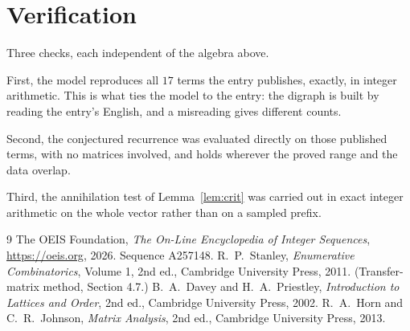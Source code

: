 \documentclass[11pt,a4paper]{article}
\theoremstyle{plain}
\theoremstyle{definition}
\begin{document}
\section{Verification}

Three checks, each independent of the algebra above.

First, the model reproduces all $17$ terms the entry publishes, exactly, in integer
arithmetic. This is what ties the model to the entry: the digraph is built by reading the
entry's English, and a misreading gives different counts.

Second, the conjectured recurrence was evaluated directly on those published terms, with no
matrices involved, and holds wherever the proved range and the data overlap.

Third, the annihilation test of Lemma~\ref{lem:crit} was carried out in exact integer
arithmetic on the whole vector rather than on a sampled prefix.

\begin{thebibliography}{9}
 The OEIS Foundation, \emph{The On-Line Encyclopedia of Integer
Sequences}, \url{https://oeis.org}, 2026. Sequence A257148.
 R.~P.~Stanley, \emph{Enumerative Combinatorics}, Volume 1, 2nd ed.,
Cambridge University Press, 2011. (Transfer-matrix method, Section 4.7.)
 B.~A.~Davey and H.~A.~Priestley, \emph{Introduction to Lattices and
Order}, 2nd ed., Cambridge University Press, 2002.
 R.~A.~Horn and C.~R.~Johnson, \emph{Matrix Analysis}, 2nd ed., Cambridge
University Press, 2013.
\end{thebibliography}
\end{document}

